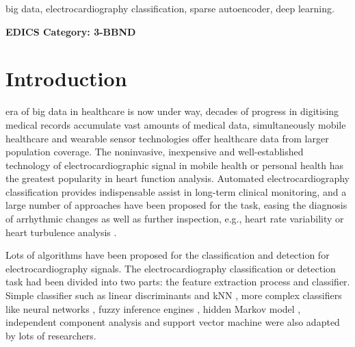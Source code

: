 \documentclass[journal]{IEEEtran}
\begin{document}
\begin{IEEEkeywords}
big data, electrocardiography classification, sparse autoencoder, deep learning.
\end{IEEEkeywords}






 \ifCLASSOPTIONpeerreview
 \begin{center} \bfseries EDICS Category: 3-BBND \end{center}
 \fi
%
\IEEEpeerreviewmaketitle



\section{Introduction}
% 
% 
% 
% 
 era of big data in healthcare is now under way, decades of progress in digitising medical records accumulate vast amounts of medical data, simultaneously mobile healthcare and wearable sensor technologies offer healthcare data from larger population coverage.
The noninvasive, inexpensive and well-established technology of electrocardiographic signal in mobile health or personal health has the greatest popularity in heart function analysis.
Automated electrocardiography classification provides indispensable assist in long-term clinical monitoring, and a large number of approaches have been proposed for the task, easing the diagnosis of arrhythmic changes as well as further inspection, e.g., heart rate variability or heart turbulence analysis \cite{mar}. 


Lots of algorithms have been proposed for the classification and detection for electrocardiography signals. 
The electrocardiography classification or detection task had been divided into two parts: the feature extraction process and classifier. 
Simple classifier such as linear discriminants \cite{chaza} and kNN \cite{melgan}, more complex classifiers like neural networks \cite{jiang, olmez, lin, osowski}, fuzzy inference engines \cite{osowski, kundu}, hidden Markov model \cite{andreao, coast}, independent component analysis \cite{zhu} and support vector machine  \cite{melgan, kampoura, khandoker} were also adapted by lots of researchers.  
\end{document}
